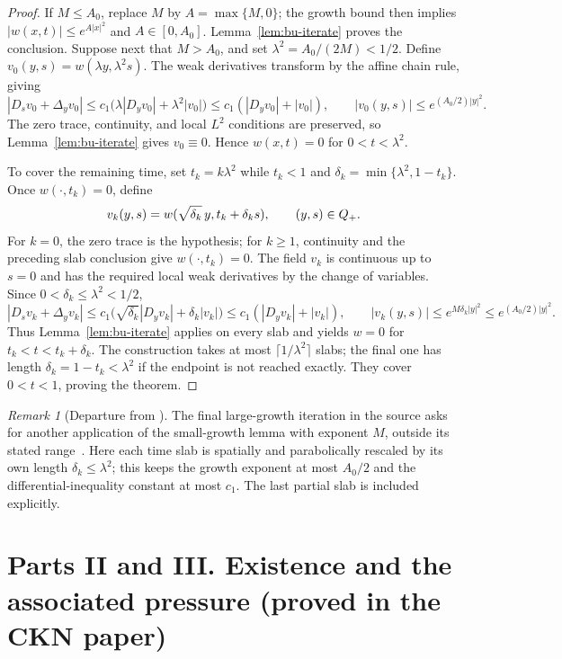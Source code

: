 \documentclass[11pt,letterpaper]{article}
\numberwithin{equation}{section}
\theoremstyle{plain}
\theoremstyle{definition}
\theoremstyle{remark}
\newtheorem{remark}[theorem]{Remark}
\begin{document}
\begin{proof}
If $M\le A_0$, replace $M$ by $A=\max\{M,0\}$; the growth bound then
implies $|w(x,t)|\le e^{A|x|^2}$ and $A\in[0,A_0]$. Lemma~\ref{lem:bu-iterate}
proves the conclusion. Suppose next that $M>A_0$, and set
$\lambda^2=A_0/(2M)<1/2$. Define $v_0(y,s)=w(\lambda y,\lambda^2s)$.
The weak derivatives transform by the affine chain rule, giving
\[
 |D_sv_0+\Delta_yv_0|
 \le c_1\big(\lambda|D_yv_0|+\lambda^2|v_0|\big)
 \le c_1(|D_yv_0|+|v_0|),\qquad
 |v_0(y,s)|\le e^{(A_0/2)|y|^2}.
\]
The zero trace, continuity, and local $L^2$ conditions are preserved, so
Lemma~\ref{lem:bu-iterate} gives $v_0\equiv0$. Hence
$w(x,t)=0$ for $0<t<\lambda^2$.

To cover the remaining time, set $t_k=k\lambda^2$ while $t_k<1$ and
$\delta_k=\min\{\lambda^2,1-t_k\}$. Once $w(\cdot,t_k)=0$, define
\[
 v_k(y,s)=w(\sqrt{\delta_k}\,y,t_k+\delta_k s),
 \qquad (y,s)\in Q_+.
\]
For $k=0$, the zero trace is the hypothesis; for $k\ge1$, continuity and
the preceding slab conclusion give $w(\cdot,t_k)=0$. The field $v_k$ is
continuous up to $s=0$ and has the required local weak derivatives by the
change of variables. Since $0<\delta_k\le\lambda^2<1/2$,
\[
 |D_sv_k+\Delta_yv_k|
 \le c_1\big(\sqrt{\delta_k}|D_yv_k|+\delta_k|v_k|\big)
 \le c_1(|D_yv_k|+|v_k|),\qquad
 |v_k(y,s)|\le e^{M\delta_k|y|^2}
 \le e^{(A_0/2)|y|^2}.
\]
Thus Lemma~\ref{lem:bu-iterate} applies on every slab and yields
$w=0$ for $t_k<t<t_k+\delta_k$. The construction takes at most
$\lceil1/\lambda^2\rceil$ slabs; the final one has length
$\delta_k=1-t_k<\lambda^2$ if the endpoint is not reached exactly. They
cover $0<t<1$, proving the theorem.
\end{proof}

\begin{remark}[Departure from \cite{ESS2003}]
The final large-growth iteration in the source asks for another application
of the small-growth lemma with exponent $M$, outside its stated range~\cite[§5, p.~238]{ESS2003}. Here
each time slab is spatially and parabolically rescaled by its own length
$\delta_k\le\lambda^2$; this keeps the growth exponent at most $A_0/2$ and
the differential-inequality constant at most $c_1$. The last partial slab
is included explicitly.
\end{remark}

\part*{Parts II and III. Existence and the associated pressure (proved in the CKN paper)}
\end{document}

